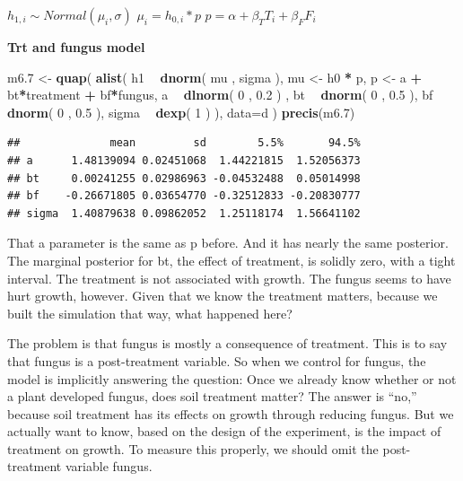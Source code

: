 \documentclass[
]{article}
\newenvironment{Shaded}{\begin{snugshade}}{\end{snugshade}}
\newcommand{\DataTypeTok}[1]{\textcolor[rgb]{0.13,0.29,0.53}{#1}}
\newcommand{\DecValTok}[1]{\textcolor[rgb]{0.00,0.00,0.81}{#1}}
\newcommand{\FloatTok}[1]{\textcolor[rgb]{0.00,0.00,0.81}{#1}}
\newcommand{\KeywordTok}[1]{\textcolor[rgb]{0.13,0.29,0.53}{\textbf{#1}}}
\newcommand{\NormalTok}[1]{#1}
\newcommand{\OperatorTok}[1]{\textcolor[rgb]{0.81,0.36,0.00}{\textbf{#1}}}
\newcommand{\StringTok}[1]{\textcolor[rgb]{0.31,0.60,0.02}{#1}}
\begin{document}
\(h_{1,i} \sim Normal(\mu_i, \sigma)\) \(\mu_i= h_{0,i}*p\)
\(p = \alpha + \beta_TT_i +\beta_FF_i\)

\textbf{Trt and fungus model}

\begin{Shaded}
\begin{Highlighting}[]
\NormalTok{m6}\FloatTok{.7}\NormalTok{ <-}\StringTok{ }\KeywordTok{quap}\NormalTok{( }\KeywordTok{alist}\NormalTok{(}
\NormalTok{h1 }\OperatorTok{~}\StringTok{ }\KeywordTok{dnorm}\NormalTok{( mu , sigma ),}
\NormalTok{mu <-}\StringTok{ }\NormalTok{h0 }\OperatorTok{*}\StringTok{ }\NormalTok{p,}
\NormalTok{p <-}\StringTok{ }\NormalTok{a }\OperatorTok{+}\StringTok{ }\NormalTok{bt}\OperatorTok{*}\NormalTok{treatment }\OperatorTok{+}\StringTok{ }\NormalTok{bf}\OperatorTok{*}\NormalTok{fungus, }
\NormalTok{a }\OperatorTok{~}\StringTok{ }\KeywordTok{dlnorm}\NormalTok{( }\DecValTok{0}\NormalTok{ , }\FloatTok{0.2}\NormalTok{ ) ,}
\NormalTok{bt }\OperatorTok{~}\StringTok{ }\KeywordTok{dnorm}\NormalTok{( }\DecValTok{0}\NormalTok{ , }\FloatTok{0.5}\NormalTok{ ),}
\NormalTok{bf }\OperatorTok{~}\StringTok{ }\KeywordTok{dnorm}\NormalTok{( }\DecValTok{0}\NormalTok{ , }\FloatTok{0.5}\NormalTok{ ),}
\NormalTok{sigma }\OperatorTok{~}\StringTok{ }\KeywordTok{dexp}\NormalTok{( }\DecValTok{1}\NormalTok{ )}
\NormalTok{), }\DataTypeTok{data=}\NormalTok{d ) }
\KeywordTok{precis}\NormalTok{(m6}\FloatTok{.7}\NormalTok{)}
\end{Highlighting}
\end{Shaded}

\begin{verbatim}
##              mean         sd        5.5%       94.5%
## a      1.48139094 0.02451068  1.44221815  1.52056373
## bt     0.00241255 0.02986963 -0.04532488  0.05014998
## bf    -0.26671805 0.03654770 -0.32512833 -0.20830777
## sigma  1.40879638 0.09862052  1.25118174  1.56641102
\end{verbatim}

That a parameter is the same as p before. And it has nearly the same
posterior. The marginal posterior for bt, the effect of treatment, is
solidly zero, with a tight interval. The treatment is not associated
with growth. The fungus seems to have hurt growth, however. Given that
we know the treatment matters, because we built the simulation that way,
what happened here?

The problem is that fungus is mostly a consequence of treatment. This is
to say that fungus is a post-treatment variable. So when we control for
fungus, the model is implicitly answering the question: Once we already
know whether or not a plant developed fungus, does soil treatment
matter? The answer is ``no,'' because soil treatment has its effects on
growth through reducing fungus. But we actually want to know, based on
the design of the experiment, is the impact of treatment on growth. To
measure this properly, we should omit the post-treatment variable
fungus.
\end{document}
